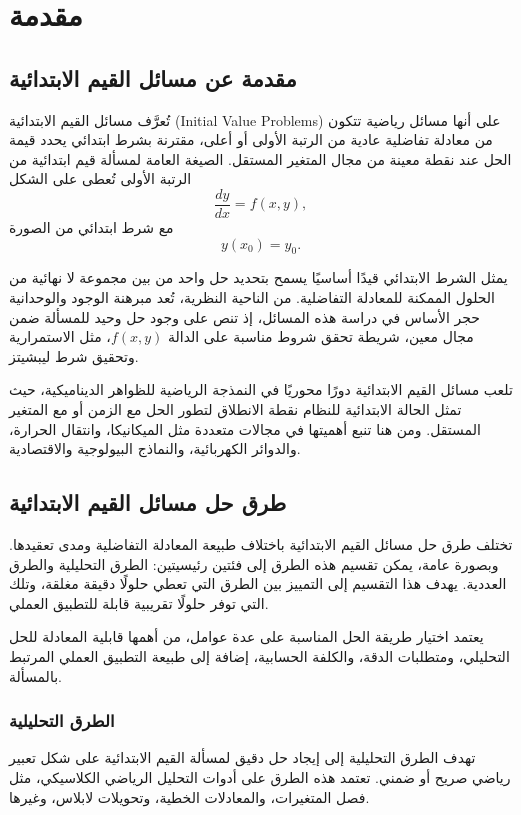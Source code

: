 \chapter{مقدمة}

\section{مقدمة عن مسائل القيم الابتدائية}
تُعرَّف مسائل القيم الابتدائية (Initial Value Problems) على أنها مسائل رياضية تتكون من معادلة تفاضلية عادية من الرتبة الأولى أو أعلى، مقترنة بشرط ابتدائي يحدد قيمة الحل عند نقطة معينة من مجال المتغير المستقل. الصيغة العامة لمسألة قيم ابتدائية من الرتبة الأولى تُعطى على الشكل
\[
\frac{dy}{dx} = f(x,y),
\]
مع شرط ابتدائي من الصورة
\[
y(x_0) = y_0.
\]

يمثل الشرط الابتدائي قيدًا أساسيًا يسمح بتحديد حل واحد من بين مجموعة لا نهائية من الحلول الممكنة للمعادلة التفاضلية. من الناحية النظرية، تُعد مبرهنة الوجود والوحدانية حجر الأساس في دراسة هذه المسائل، إذ تنص على وجود حل وحيد للمسألة ضمن مجال معين، شريطة تحقق شروط مناسبة على الدالة \(f(x,y)\)، مثل الاستمرارية وتحقيق شرط ليبشيتز.

تلعب مسائل القيم الابتدائية دورًا محوريًا في النمذجة الرياضية للظواهر الديناميكية، حيث تمثل الحالة الابتدائية للنظام نقطة الانطلاق لتطور الحل مع الزمن أو مع المتغير المستقل. ومن هنا تنبع أهميتها في مجالات متعددة مثل الميكانيكا، وانتقال الحرارة، والدوائر الكهربائية، والنماذج البيولوجية والاقتصادية.

\section{طرق حل مسائل القيم الابتدائية}
تختلف طرق حل مسائل القيم الابتدائية باختلاف طبيعة المعادلة التفاضلية ومدى تعقيدها. وبصورة عامة، يمكن تقسيم هذه الطرق إلى فئتين رئيسيتين: الطرق التحليلية والطرق العددية. يهدف هذا التقسيم إلى التمييز بين الطرق التي تعطي حلولًا دقيقة مغلقة، وتلك التي توفر حلولًا تقريبية قابلة للتطبيق العملي.

يعتمد اختيار طريقة الحل المناسبة على عدة عوامل، من أهمها قابلية المعادلة للحل التحليلي، ومتطلبات الدقة، والكلفة الحسابية، إضافة إلى طبيعة التطبيق العملي المرتبط بالمسألة.

\subsection{الطرق التحليلية}
تهدف الطرق التحليلية إلى إيجاد حل دقيق لمسألة القيم الابتدائية على شكل تعبير رياضي صريح أو ضمني. تعتمد هذه الطرق على أدوات التحليل الرياضي الكلاسيكي، مثل فصل المتغيرات، والمعادلات الخطية، وتحويلات لابلاس، وغيرها.

